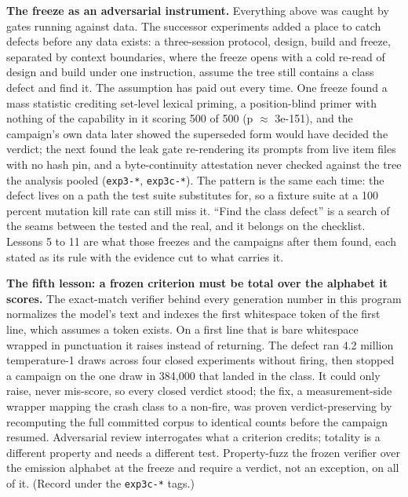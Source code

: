 \textbf{The freeze as an adversarial instrument.} Everything above was
caught by gates running against data. The successor experiments added
a place to catch defects before any data exists: a three-session
protocol, design, build and freeze, separated by context boundaries,
where the freeze opens with a cold re-read of design and build under
one instruction, assume the tree still contains a class defect and
find it. The assumption has paid out every time. One freeze found a
mass statistic crediting set-level lexical priming, a position-blind
primer with nothing of the capability in it scoring 500 of 500
(p $\approx$ 3e-151), and the campaign's own data later showed the superseded
form would have decided the verdict; the next found the leak gate
re-rendering its prompts from live item files with no hash pin, and a
byte-continuity attestation never checked against the tree the
analysis pooled (\texttt{exp3-*}, \texttt{exp3c-*}). The pattern is the same each
time: the defect lives on a path the test suite substitutes for, so a
fixture suite at a 100 percent mutation kill rate can still miss it.
``Find the class defect'' is a search of the seams between the tested
and the real, and it belongs on the checklist. Lessons 5 to 11 are
what those freezes and the campaigns after them found, each stated as
its rule with the evidence cut to what carries it.

\textbf{The fifth lesson: a frozen criterion must be total over the alphabet
it scores.} The exact-match verifier behind every generation number
in this program normalizes the model's text and indexes the first
whitespace token of the first line, which assumes a token exists. On a
first line that is bare whitespace wrapped in punctuation it raises
instead of returning. The defect ran 4.2 million temperature-1 draws
across four closed experiments without firing, then stopped a campaign
on the one draw in 384,000 that landed in the class. It could only
raise, never mis-score, so every closed verdict stood; the fix, a
measurement-side wrapper mapping the crash class to a non-fire, was
proven verdict-preserving by recomputing the full committed corpus to
identical counts before the campaign resumed. Adversarial review
interrogates what a criterion credits; totality is a different
property and needs a different test. Property-fuzz the frozen verifier
over the emission alphabet at the freeze and require a verdict, not an
exception, on all of it. (Record under the \texttt{exp3c-*} tags.)

